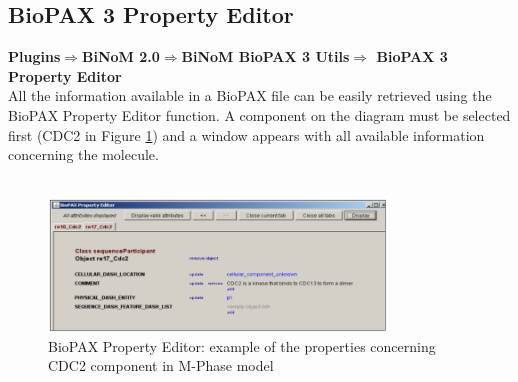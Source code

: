 \subsection{BioPAX 3 Property Editor} \label{BioPAX_Property_Editor}
\textbf{Plugins$\Rightarrow$BiNoM 2.0$\Rightarrow$BiNoM BioPAX 3 Utils$\Rightarrow$ BioPAX 3 Property Editor}\\

All the information available in a BioPAX file can be easily retrieved using the
BioPAX Property Editor function. A component on the diagram must be selected
first (CDC2 in Figure \ref{BioPAX_Property_Editor_cdc2}) and a window appears
with all available information concerning the molecule.\\\\

\begin{figure}[h]
\centering
\includegraphics[width=0.8\textwidth]{graphics/BioPAX_Property_Editor_cdc2}
\caption{BioPAX Property Editor: example of the properties concerning CDC2
component in M-Phase model}
\label{BioPAX_Property_Editor_cdc2}
\end{figure}


